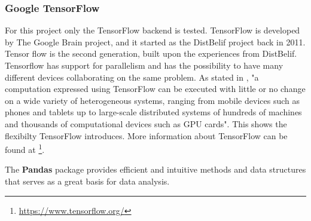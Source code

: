     \subsubsection{Google TensorFlow}
        For this project only the TensorFlow backend is tested. TensorFlow \cite{Abadi} is developed by The Google Brain project, and it started as the DistBelif project back in 2011. Tensor flow is the second generation, built upon the experiences from DistBelif. Tensorflow has support for parallelism and has the possibility to have many different devices collaborating on the same problem. As stated in \cite{Abadi}, "a computation expressed using TensorFlow can be executed with little or no change on a wide variety of heterogeneous systems, ranging from mobile devices such as phones and tablets up to large-scale distributed systems of hundreds of machines and thousands of computational devices such as GPU cards". This shows the flexibilty TensorFlow introduces. More information about TensorFlow can be found at \footnote{\url{https://www.tensorflow.org/}}.
    
    
    The \textbf{Pandas} package \cite{Mckinney2010} provides efficient and intuitive methods and data structures that serves as a great basis for data analysis. 